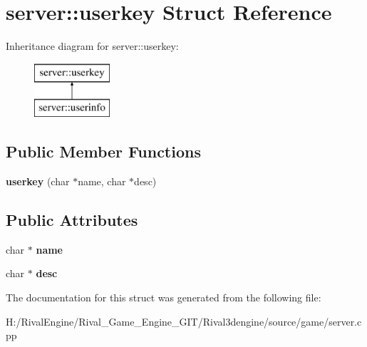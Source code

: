 \hypertarget{structserver_1_1userkey}{}\section{server\+:\+:userkey Struct Reference}
\label{structserver_1_1userkey}
Inheritance diagram for server\+:\+:userkey\+:\begin{figure}[H]
\begin{center}
\leavevmode
\includegraphics[height=2.000000cm]{structserver_1_1userkey}
\end{center}
\end{figure}
\subsection*{Public Member Functions}
\begin{DoxyCompactItemize}
\item 
\mbox{\label{structserver_1_1userkey_acc3dc1e5cdba4a96c3527c8ab63b65f2}} 
{\bfseries userkey} (char $\ast$name, char $\ast$desc)
\end{DoxyCompactItemize}
\subsection*{Public Attributes}
\begin{DoxyCompactItemize}
\item 
\mbox{\label{structserver_1_1userkey_a3f851cbc45d3a548ac48d2821b5d150d}} 
char $\ast$ {\bfseries name}
\item 
\mbox{\label{structserver_1_1userkey_a078e2f81e9e6c8ff360c2b8dfa10f690}} 
char $\ast$ {\bfseries desc}
\end{DoxyCompactItemize}


The documentation for this struct was generated from the following file\+:\begin{DoxyCompactItemize}
\item 
H\+:/\+Rival\+Engine/\+Rival\+\_\+\+Game\+\_\+\+Engine\+\_\+\+G\+I\+T/\+Rival3dengine/source/game/server.\+cpp\end{DoxyCompactItemize}
